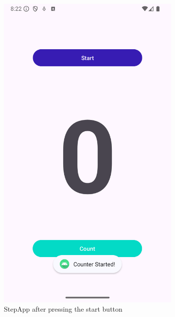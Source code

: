 \documentclass{usireport}
\begin{document}
\begin{figure}[H]
    \centering
    \begin{subfigure}{0.4\textwidth}
        \centering
        \includegraphics[width=0.65\linewidth]{fig/stepapp_start.png}
        \caption{StepApp after pressing the start button}
        \label{fig:stepapp_start}
    \end{subfigure}
    \hspace{1cm}
    \begin{subfigure}{0.4\textwidth}
        \centering

\end{subfigure}
\end{figure}
\end{document}
